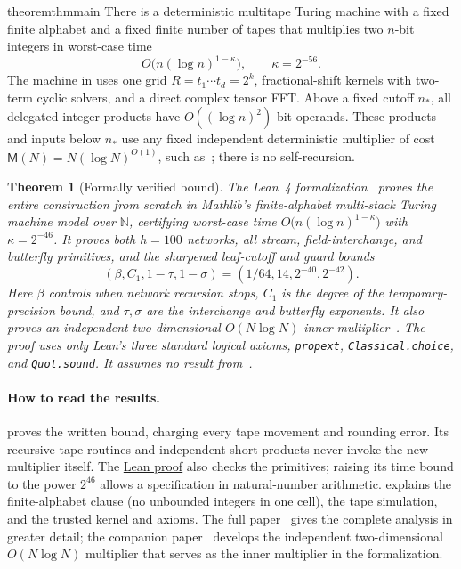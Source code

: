 \documentclass[11pt]{article}
\newtheorem{theorem}{Theorem}[section]
\theoremstyle{definition}
\renewcommand{\label}[1]{}%
\newcommand{\N}{\mathbb{N}}
\begin{document}
\begin{restatable}{theorem}{thmmain}\label{thm:main}
There is a deterministic multitape Turing machine with a fixed finite alphabet and a fixed finite number of tapes that multiplies two $n$-bit integers in worst-case time
\[
 O\bigl(n(\log n)^{1-\kappa}\bigr),\qquad \kappa=2^{-56}.
\]
The machine in  uses one grid $R=t_1\cdots t_d=2^k$, fractional-shift kernels with two-term cyclic solvers, and a direct complex tensor FFT.
Above a fixed cutoff $n_*$, all delegated integer products have $O((\log n)^2)$-bit operands.
These products and inputs below $n_*$ use any fixed independent deterministic multiplier of cost $\mathsf{M}(N)=N(\log N)^{O(1)}$, such as~\cite{SS71}; there is no self-recursion.
\end{restatable}

\begin{theorem}[Formally verified bound]\label{thm:lean}
The Lean~4 formalization~\cite{dMU21,mC20,Lean26} proves the entire construction from scratch in Mathlib's finite-alphabet multi-stack Turing machine model over $\N$, certifying worst-case time $O\bigl(n(\log n)^{1-\kappa}\bigr)$ with $\kappa=2^{-46}$.
It proves both $h=100$ networks, all stream, field-interchange, and butterfly primitives, and the sharpened leaf-cutoff and guard bounds
\[
 (\beta,C_1,1-\tau,1-\sigma)=(1/64,14,2^{-40},2^{-42}).
\]
Here $\beta$ controls when network recursion stops, $C_1$ is the degree of the temporary-precision bound, and $\tau,\sigma$ are the interchange and butterfly exponents.
It also proves an independent two-dimensional $O(N\log N)$ inner multiplier~\cite{MS}.
The proof uses only Lean's three standard logical axioms, \texttt{propext}, \texttt{Classical.\allowbreak choice}, and \texttt{Quot.\allowbreak sound}.
It assumes no result from~\cite{OAI26,HvdH21}.
\end{theorem}

\paragraph{How to read the results.}
 proves the written bound, charging every tape movement and rounding error.
Its recursive tape routines and independent short products never invoke the new multiplier itself.
The \href{https://github.com/lockqueue/intmul}{Lean proof} also checks the primitives; raising its time bound to the power $2^{46}$ allows a specification in natural-number arithmetic.
 explains the finite-alphabet clause (no unbounded integers in one cell), the tape simulation, and the trusted kernel and axioms.
The full paper~\cite{Full26} gives the complete analysis in greater detail; the companion paper~\cite{MS} develops the independent two-dimensional $O(N\log N)$ multiplier that serves as the inner multiplier in the formalization.
\end{document}
